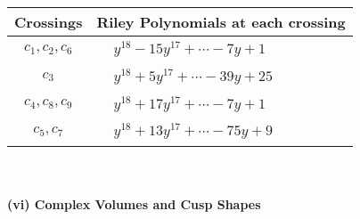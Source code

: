 \documentclass[1p]{elsarticle_modified}
\theoremstyle{definition}
\begin{document}
\begin{tabular}{m{50pt}|m{274pt}}
Crossings & \hspace{64pt}Riley Polynomials at each crossing \\
\hline $$\begin{aligned}c_{1},c_{2},c_{6}\end{aligned}$$&$\begin{aligned}
&y^{18}-15 y^{17}+\cdots-7 y+1
\end{aligned}$\\
\hline $$\begin{aligned}c_{3}\end{aligned}$$&$\begin{aligned}
&y^{18}+5 y^{17}+\cdots-39 y+25
\end{aligned}$\\
\hline $$\begin{aligned}c_{4},c_{8},c_{9}\end{aligned}$$&$\begin{aligned}
&y^{18}+17 y^{17}+\cdots-7 y+1
\end{aligned}$\\
\hline $$\begin{aligned}c_{5},c_{7}\end{aligned}$$&$\begin{aligned}
&y^{18}+13 y^{17}+\cdots-75 y+9
\end{aligned}$\\
\hline
\end{tabular}\\~\\
\newpage\flushleft \textbf{(vi) Complex Volumes and Cusp Shapes}
\end{document}
